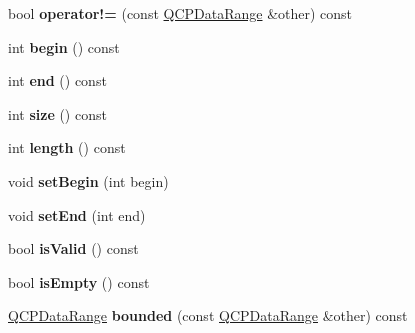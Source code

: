 \begin{DoxyCompactItemize}
\item 
bool {\bfseries operator!=} (const \hyperlink{class_q_c_p_data_range}{Q\+C\+P\+Data\+Range} \&other) const \hypertarget{class_q_c_p_data_range_a8eaea2a7c791e7ef494b03af547417a4}{}\label{class_q_c_p_data_range_a8eaea2a7c791e7ef494b03af547417a4}

\item 
int {\bfseries begin} () const \hypertarget{class_q_c_p_data_range_a6b14c93d5010e973427b8ecaebf77864}{}\label{class_q_c_p_data_range_a6b14c93d5010e973427b8ecaebf77864}

\item 
int {\bfseries end} () const \hypertarget{class_q_c_p_data_range_add50cb7075b68a0dd35fb5c962c81bbf}{}\label{class_q_c_p_data_range_add50cb7075b68a0dd35fb5c962c81bbf}

\item 
int {\bfseries size} () const \hypertarget{class_q_c_p_data_range_aec29c6f4234c01ed7a56c3bb0e75f340}{}\label{class_q_c_p_data_range_aec29c6f4234c01ed7a56c3bb0e75f340}

\item 
int {\bfseries length} () const \hypertarget{class_q_c_p_data_range_a4e65d1bf09fce82dbc67a7b71b2cf088}{}\label{class_q_c_p_data_range_a4e65d1bf09fce82dbc67a7b71b2cf088}

\item 
void {\bfseries set\+Begin} (int begin)\hypertarget{class_q_c_p_data_range_a54ff59048e01e46ac4aefafc844626c6}{}\label{class_q_c_p_data_range_a54ff59048e01e46ac4aefafc844626c6}

\item 
void {\bfseries set\+End} (int end)\hypertarget{class_q_c_p_data_range_a277f1a9eafe70b9184d9c00b641ae5de}{}\label{class_q_c_p_data_range_a277f1a9eafe70b9184d9c00b641ae5de}

\item 
bool {\bfseries is\+Valid} () const \hypertarget{class_q_c_p_data_range_a063eeb2c81e86900d974936cbb83f508}{}\label{class_q_c_p_data_range_a063eeb2c81e86900d974936cbb83f508}

\item 
bool {\bfseries is\+Empty} () const \hypertarget{class_q_c_p_data_range_a2ab2e0710dbd4493133ab582ef7e5fc3}{}\label{class_q_c_p_data_range_a2ab2e0710dbd4493133ab582ef7e5fc3}

\item 
\hyperlink{class_q_c_p_data_range}{Q\+C\+P\+Data\+Range} {\bfseries bounded} (const \hyperlink{class_q_c_p_data_range}{Q\+C\+P\+Data\+Range} \&other) const \hypertarget{class_q_c_p_data_range_a4de1bec5a6e1145bd332d93ac2cc8327}{}\label{class_q_c_p_data_range_a4de1bec5a6e1145bd332d93ac2cc8327}


\end{DoxyCompactItemize}
